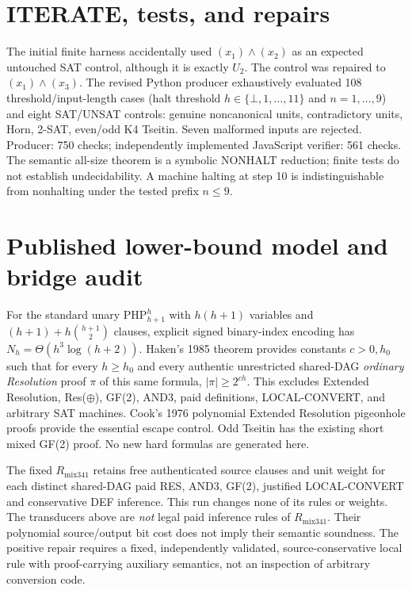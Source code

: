 \documentclass[11pt]{article}
\begin{document}
\section*{ITERATE, tests, and repairs}
The initial finite harness accidentally used $(x_1)\wedge(x_2)$ as an expected untouched SAT control, although it is exactly $U_2$. The control was repaired to $(x_1)\wedge(x_3)$. The revised Python producer exhaustively evaluated 108 threshold/input-length cases (halt threshold $h\in\{\bot,1,\ldots,11\}$ and $n=1,\ldots,9$) and eight SAT/UNSAT controls: genuine noncanonical units, contradictory units, Horn, 2-SAT, even/odd K4 Tseitin. Seven malformed inputs are rejected. Producer: 750 checks; independently implemented JavaScript verifier: 561 checks. The semantic all-size theorem is a symbolic NONHALT reduction; finite tests do not establish undecidability. A machine halting at step 10 is indistinguishable from nonhalting under the tested prefix $n\le9$.

\section*{Published lower-bound model and bridge audit}
For the standard unary $\mathrm{PHP}_{h+1}^h$ with $h(h+1)$ variables and $(h+1)+h\binom{h+1}{2}$ clauses, explicit signed binary-index encoding has $N_h=\Theta(h^3\log(h+2))$. Haken's 1985 theorem provides constants $c>0,h_0$ such that for every $h\ge h_0$ and every authentic unrestricted shared-DAG \emph{ordinary Resolution} proof $\pi$ of this same formula, $|\pi|\ge2^{ch}$. This excludes Extended Resolution, Res($\oplus$), GF(2), AND3, paid definitions, LOCAL-CONVERT, and arbitrary SAT machines. Cook's 1976 polynomial Extended Resolution pigeonhole proofs provide the essential escape control. Odd Tseitin has the existing short mixed GF(2) proof. No new hard formulas are generated here.

The fixed $R_{\mathrm{mix341}}$ retains free authenticated source clauses and unit weight for each distinct shared-DAG paid RES, AND3, GF(2), justified LOCAL-CONVERT and conservative DEF inference. This run changes none of its rules or weights. The transducers above are \emph{not} legal paid inference rules of $R_{\mathrm{mix341}}$. Their polynomial source/output bit cost does not imply their semantic soundness. The positive repair requires a fixed, independently validated, source-conservative local rule with proof-carrying auxiliary semantics, not an inspection of arbitrary conversion code.
\end{document}
